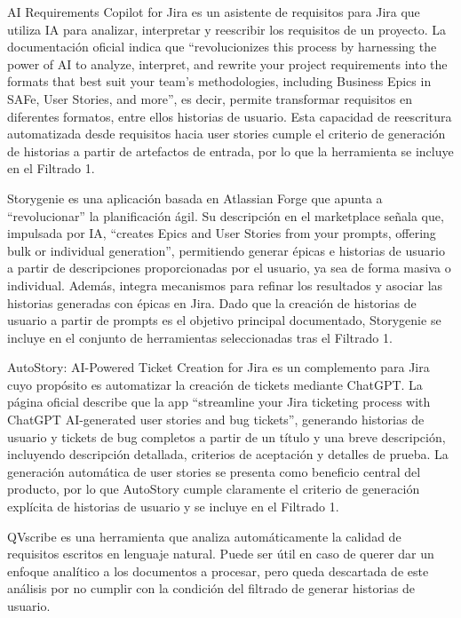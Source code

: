 AI Requirements Copilot for Jira \cite{airequirementscopilot} es un asistente de requisitos para Jira que utiliza IA para analizar, interpretar y reescribir los requisitos de un proyecto. La documentación oficial indica que “revolucionizes this process by harnessing the power of AI to analyze, interpret, and rewrite your project requirements into the formats that best suit your team's methodologies, including Business Epics in SAFe, User Stories, and more”, es decir, permite transformar requisitos en diferentes formatos, entre ellos historias de usuario. Esta capacidad de reescritura automatizada desde requisitos hacia user stories cumple el criterio de generación de historias a partir de artefactos de entrada, por lo que la herramienta se incluye en el Filtrado 1.

Storygenie \cite{storygenie} es una aplicación basada en Atlassian Forge que apunta a “revolucionar” la planificación ágil. Su descripción en el marketplace señala que, impulsada por IA, “creates Epics and User Stories from your prompts, offering bulk or individual generation”, permitiendo generar épicas e historias de usuario a partir de descripciones proporcionadas por el usuario, ya sea de forma masiva o individual. Además, integra mecanismos para refinar los resultados y asociar las historias generadas con épicas en Jira. Dado que la creación de historias de usuario a partir de prompts es el objetivo principal documentado, Storygenie se incluye en el conjunto de herramientas seleccionadas tras el Filtrado 1.

AutoStory: AI-Powered Ticket Creation for Jira \cite{autostory} es un complemento para Jira cuyo propósito es automatizar la creación de tickets mediante ChatGPT. La página oficial describe que la app “streamline your Jira ticketing process with ChatGPT AI-generated user stories and bug tickets”, generando historias de usuario y tickets de bug completos a partir de un título y una breve descripción, incluyendo descripción detallada, criterios de aceptación y detalles de prueba. La generación automática de user stories se presenta como beneficio central del producto, por lo que AutoStory cumple claramente el criterio de generación explícita de historias de usuario y se incluye en el Filtrado 1.

QVscribe \cite{qvscribe} es una herramienta que analiza automáticamente la calidad de requisitos escritos en lenguaje natural. Puede ser útil en caso de querer dar un enfoque analítico a los documentos a procesar, pero queda descartada de este análisis por no cumplir con la condición del filtrado de generar historias de usuario.

